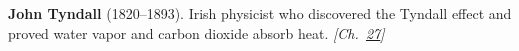 \textbf{John Tyndall} (1820–1893). Irish physicist who discovered the Tyndall effect and proved water vapor and carbon dioxide absorb heat. \emph{[Ch.~\hyperref[ch:planetaryskycolors]{27}]}

